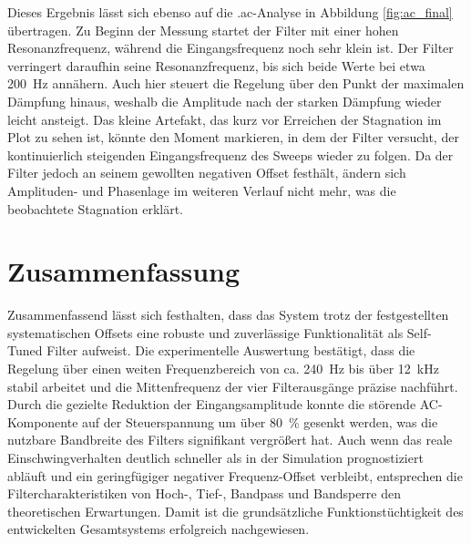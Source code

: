 \documentclass[../main_config.tex]{subfiles}
\begin{document}
Dieses Ergebnis lässt sich ebenso auf die .ac-Analyse in Abbildung \ref{fig:ac_final} übertragen. Zu Beginn der Messung startet der Filter mit einer hohen Resonanzfrequenz, während die Eingangsfrequenz noch sehr klein ist. Der Filter verringert daraufhin seine Resonanzfrequenz, bis sich beide Werte bei etwa \SI{200}{\hertz} annähern. Auch hier steuert die Regelung über den Punkt der maximalen Dämpfung hinaus, weshalb die Amplitude nach der starken Dämpfung wieder leicht ansteigt. Das kleine Artefakt, das kurz vor Erreichen der Stagnation im Plot zu sehen ist, könnte den Moment markieren, in dem der Filter versucht, der kontinuierlich steigenden Eingangsfrequenz des Sweeps wieder zu folgen. Da der Filter jedoch an seinem gewollten negativen Offset festhält, ändern sich Amplituden- und Phasenlage im weiteren Verlauf nicht mehr, was die beobachtete Stagnation erklärt.\par
\medskip


\section{Zusammenfassung}
Zusammenfassend lässt sich festhalten, dass das System trotz der festgestellten systematischen Offsets eine robuste und zuverlässige Funktionalität als Self-Tuned Filter aufweist. Die experimentelle Auswertung bestätigt, dass die Regelung über einen weiten Frequenzbereich von ca. \SI{240}{\hertz} bis über \SI{12}{\kilo\hertz} stabil arbeitet und die Mittenfrequenz der vier Filterausgänge präzise nachführt. Durch die gezielte Reduktion der Eingangsamplitude konnte die störende AC-Komponente auf der Steuerspannung um über \SI{80}{\percent} gesenkt werden, was die nutzbare Bandbreite des Filters signifikant vergrößert hat. Auch wenn das reale Einschwingverhalten deutlich schneller als in der Simulation prognostiziert abläuft und ein geringfügiger negativer Frequenz-Offset verbleibt, entsprechen die Filtercharakteristiken von Hoch-, Tief-, Bandpass und Bandsperre den theoretischen Erwartungen. Damit ist die grundsätzliche Funktionstüchtigkeit des entwickelten Gesamtsystems erfolgreich nachgewiesen.
\end{document}
